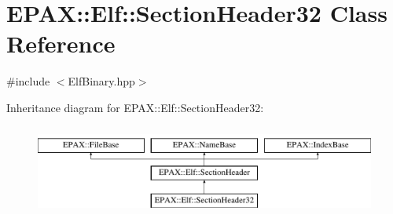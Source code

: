 \hypertarget{class_e_p_a_x_1_1_elf_1_1_section_header32}{\section{\-E\-P\-A\-X\-:\-:\-Elf\-:\-:\-Section\-Header32 \-Class \-Reference}
\label{class_e_p_a_x_1_1_elf_1_1_section_header32}
}


{\ttfamily \#include $<$\-Elf\-Binary.\-hpp$>$}

\-Inheritance diagram for \-E\-P\-A\-X\-:\-:\-Elf\-:\-:\-Section\-Header32\-:\begin{figure}[H]
\begin{center}
\leavevmode
\includegraphics[height=3.000000cm]{class_e_p_a_x_1_1_elf_1_1_section_header32}
\end{center}
\end{figure}

